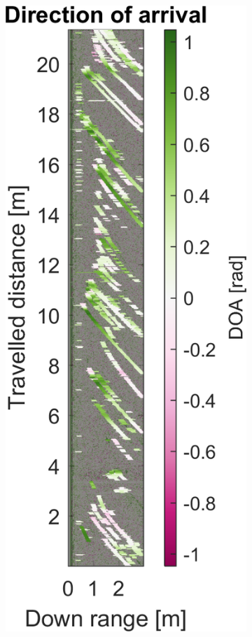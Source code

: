 \begin{figure}[htbp]
\begin{subfigure}[t]{0.475\linewidth}
    \end{subfigure}\bigskip\\
    \begin{subfigure}[t]{0.475\linewidth}  
        \centering 
        \includegraphics[width=\linewidth,max height=.475\textheight]{gfx/results/orbit_doa.png}

\end{subfigure}
\end{figure}
